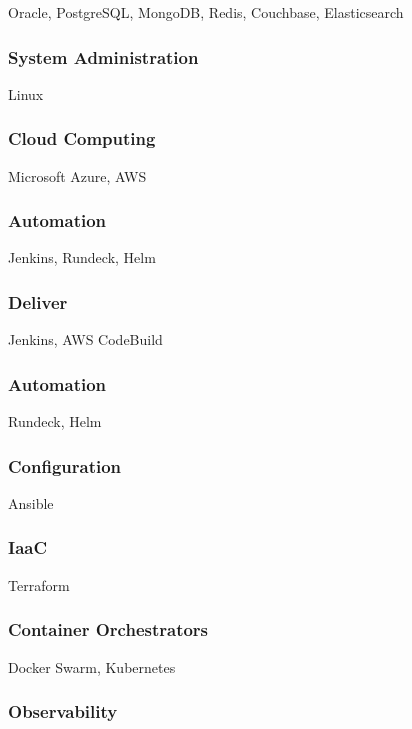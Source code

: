 \documentclass{article}
\begin{document}
Oracle, PostgreSQL, MongoDB, Redis, Couchbase, Elasticsearch

\subsubsection{System Administration}

Linux

\subsubsection{Cloud Computing}

Microsoft Azure, AWS

\subsubsection{Automation}

Jenkins, Rundeck, Helm

\subsubsection{Deliver}

Jenkins, AWS CodeBuild

\subsubsection{Automation}

Rundeck, Helm

\subsubsection{Configuration}

Ansible

\subsubsection{IaaC}

Terraform

\subsubsection{Container Orchestrators}

Docker Swarm, Kubernetes

\subsubsection{Observability}
\end{document}
